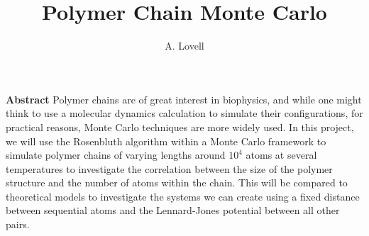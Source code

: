 \documentclass{article}
\begin{document}
\title{Polymer Chain Monte Carlo}
\author{A. Lovell}
\maketitle

\noindent \textbf{Abstract}  Polymer chains are of great interest in biophysics, and while one might think to use a molecular dynamics calculation to simulate their configurations, for practical reasons, Monte Carlo techniques are more widely used.  In this project, we will use the Rosenbluth algorithm within a Monte Carlo framework to simulate polymer chains of varying lengths around $10^4$ atoms at several temperatures to investigate the correlation between the size of the polymer structure and the number of atoms within the chain.  This will be compared to theoretical models to investigate the systems we can create using a fixed distance between sequential atoms and the Lennard-Jones potential between all other pairs.
\end{document}
